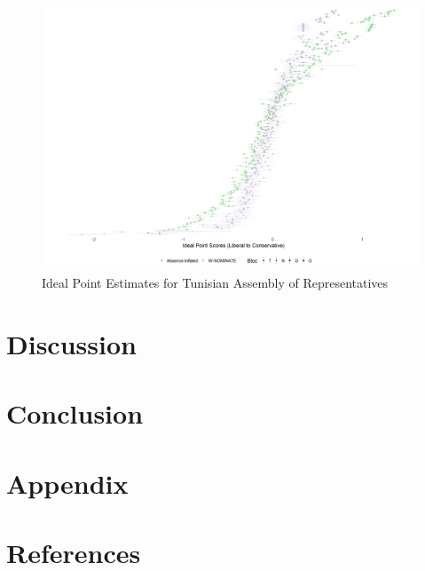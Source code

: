 	
	\begin{figure}
		\centering
		\caption{Ideal Point Estimates for Tunisian Assembly of Representatives}\label{tunis_ideal}
		\includegraphics[width=\linewidth]{tunisia_arp_compare}
	\end{figure}
	
	\section*{Discussion}
	
	\section*{Conclusion}
	
	\section*{Appendix}
	
	\section*{References}
	
	\printbibliography
	
